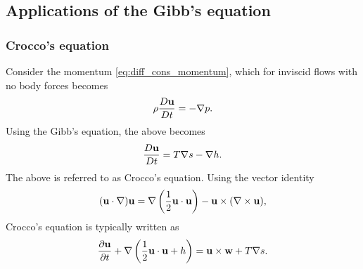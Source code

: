 \documentclass[oneside,a4paper,11pt]{report}
\begin{document}
\subsection{Applications of the Gibb's equation}
\subsubsection{Crocco's equation}
Consider the momentum \cref{eq:diff_cons_momentum}, which for inviscid flows with no body forces becomes
\begin{equation}
    \rho \frac{D \mathbf{u}}{Dt} = -\nabla p.
\end{equation}
Using the Gibb's equation, the above becomes
\begin{equation}
    \frac{D \mathbf{u}}{Dt} = T\nabla s - \nabla h.
\end{equation}
The above is referred to as Crocco's equation. Using the vector identity
\begin{equation}
    (\mathbf{u} \cdot \nabla) \mathbf{u} = \nabla \left ( \frac{1}{2} \mathbf{u} \cdot \mathbf{u} \right ) - \mathbf{u} \times (\nabla \times \mathbf{u}),
\end{equation}
Crocco's equation is typically written as
\begin{equation}
    \frac{\partial \mathbf{u}}{\partial t} + \nabla \left (\frac{1}{2} \mathbf{u} \cdot \mathbf{u} + h \right ) = \mathbf{u} \times \mathbf{w} + T \nabla s.
\end{equation}
\end{document}
